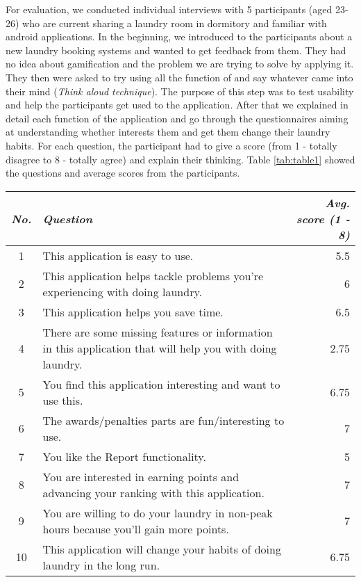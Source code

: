 For evaluation, we conducted individual interviews with 5 participants (aged 23-26) who are current sharing a laundry room in dormitory and familiar with android applications. In the beginning, we introduced to the participants about a new laundry booking systems and wanted to get feedback from them. They had no idea about gamification and the problem we are trying to solve by applying it. They then were asked to try using all the function of {\toolname} and say whatever came into their mind (\emph{Think aloud technique}). The purpose of this step was to test usability and help the participants get used to the application. After that we explained in detail each function of the application and go through the questionnaires aiming at understanding whether {\toolname} interests them and get them change their laundry habits. For each question, the participant had to give a score (from 1 - totally disagree to 8 - totally agree) and explain their thinking. Table \ref{tab:table1} showed the questions and average scores from the participants.
\begin{table*}
  \centering
  \begin{tabular}{c|l|r}
     {\textit{No.}} &{\textit{Question}} & {\textit{Avg. score (1 - 8)}} \\
    \midrule
    1&This application is easy to use. & 5.5 \\
    2&This application helps tackle problems you’re experiencing with doing laundry. & 6 \\
    3&This application helps you save time. & 6.5\\
    4&There are some missing features or information in this application that will help you with doing laundry. & 2.75 \\
    \midrule
		5&You find this application interesting and want to use this. & 6.75\\
		6&The awards/penalties parts are fun/interesting to use. & 7\\
		7&You like the Report functionality. & 5\\
		8&You are interested in earning points and advancing your ranking with this application. & 7\\
		\midrule
		9&You are willing to do your laundry in non-peak hours because you'll gain more points. & 7\\
		10&This application will change your habits of doing laundry in the long run. & 6.75
  \end{tabular}
  \caption{Questions and average score from the participants.}~\label{tab:table1}
\end{table*}
